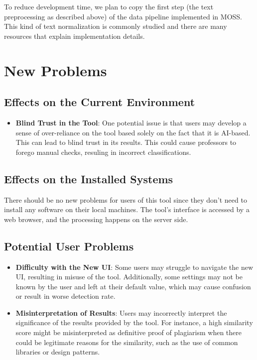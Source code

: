 \documentclass[12pt]{article}
\begin{document}
To reduce development time, we plan to copy the first step (the text preprocessing as described above) of the data pipeline implemented in MOSS. This kind of text normalization is commonly studied and there are many resources that explain implementation details.

\section{New Problems}
\subsection{Effects on the Current Environment}
\begin{itemize}
    \item \textbf{Blind Trust in the Tool}: One potential issue is that users may develop a sense of over-reliance on the tool based solely on the fact that it is AI-based. This can lead to blind trust in its results. This could cause professors to forego manual checks, resuling in incorrect classifications.
\end{itemize}

\subsection{Effects on the Installed Systems}
There should be no new problems for users of this tool since they don't need to install any software on their local machines. The tool's interface is accessed by a web browser, and the processing happens on the server side.

\subsection{Potential User Problems}
\begin{itemize}
    \item \textbf{Difficulty with the New UI}: Some users may struggle to navigate the new UI, resulting in misuse of the tool. Additionally, some settings may not be known by the user and left at their default value, which may cause confusion or result in worse detection rate.

    \item \textbf{Misinterpretation of Results}: Users may incorrectly interpret the significance of the results provided by the tool. For instance, a high similarity score might be misinterpreted as definitive proof of plagiarism when there could be legitimate reasons for the similarity, such as the use of common libraries or design patterns.
\end{itemize}
\end{document}
